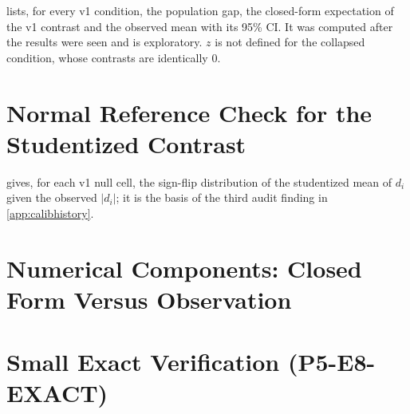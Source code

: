 \documentclass{article}
\theoremstyle{plain}
\theoremstyle{definition}
\theoremstyle{remark}
\newcommand{\E}{\mathbb{E}}
\begin{document}
 lists, for every v1 condition, the population gap, the closed-form expectation of the v1 contrast and the observed mean with its 95\% CI. It was computed after the results were seen and is exploratory. $z$ is not defined for the collapsed condition, whose contrasts are identically $0$.
\begin{table}[h]
\centering
\caption{Closed-form expectation versus observation, all v1 cells (values $\times10^3$).}
\label{tab:reanalysis}
\scriptsize

\end{table}

\section{Normal Reference Check for the Studentized Contrast}
\label{app:znull}
 gives, for each v1 null cell, the sign-flip distribution of the studentized mean of $d_i$ given the observed $|d_i|$; it is the basis of the third audit finding in \cref{app:calibhistory}.
\begin{table}[h]
\centering
\caption{Sign-flip distribution of the studentized mean of $d_i$ given the observed $|d_i|$ (4999 flips) for the seven v1 null cells.}
\label{tab:znull}
\small

\end{table}

\section{Numerical Components: Closed Form Versus Observation}
\label{app:numerics}
\begin{table}[h]
\centering
\caption{Numerical components with exact scores ($N=100$, $M=256$, Test~S). $D_{\mathrm{pop}}$ is the closed-form population gap between the direct and sequential sampler laws, and $\E[d]$ is the closed-form expectation of the v1 contrast. All values $\times10^3$, standardized.}
\label{tab:numerics}
\scriptsize
\setlength{\tabcolsep}{3pt}

\end{table}

\section{Small Exact Verification (P5-E8-EXACT)}
\label{app:e8}
\begin{table}[h]
\centering
\caption{P5-E8-EXACT, Test~P with exact enumeration of the product permutation group ($N=3$ examples, $M=3$, $|G|=20^3$), nominal $\alpha=0.05$, one-sided 95\% Clopper--Pearson bounds on the rejection rate over independent datasets. ``Excess flagged'' means the lower bound exceeds $\alpha$; ``powered'' means the lower bound exceeds $\alpha$ under an alternative. Two negative-control rules are evaluated with the same criteria.}
\label{tab:e8}
\scriptsize
\setlength{\tabcolsep}{2.5pt}

\end{table}
\end{document}

